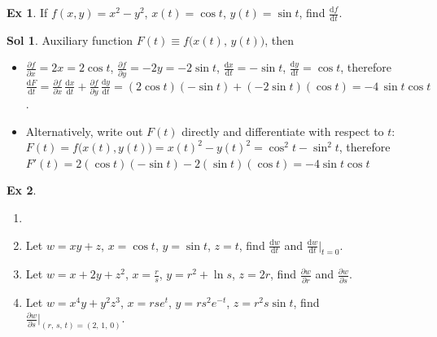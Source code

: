 \documentclass[12pt]{extarticle}
\newcommand{\ds}{\displaystyle}
\theoremstyle{definition}
\newtheorem*{ex}{Ex}
\newtheorem*{sol}{Sol}
\newcommand{\pdiff}[2]{\frac{\partial #1}{\partial #2}}
\newcommand{\diff}[2]{\frac{\mathrm{d} #1}{\mathrm{d} #2}}
\begin{document}
\begin{ex}
  If $\ds f(x,y) = x^2 - y^2$, $x(t) = \cos t$, $y(t) = \sin t$, find $\ds\diff{f}{t}$. 
\end{ex}
\begin{sol}
  Auxiliary function $\ds F(t)\equiv f\big(x(t),\,y(t)\big)$, then
  \begin{itemize}\setlength{\itemsep}{0pt}
    \item $\ds\pdiff{f}{x} = 2x = 2\cos t$, $\ds\pdiff{f}{y} = -2y = -2\sin t$, $\ds\diff{x}{t} = -\sin t$, $\ds\diff{y}{t} = \cos t$, therefore $\ds\diff{F}{t} = \pdiff{f}{x}\,\diff{x}{t} + \pdiff{f}{y}\,\diff{y}{t} = (2\cos t)(-\sin t) + (-2\sin t)(\cos t) = -4\,\sin t\cos t$. 
    \item Alternatively, write out $F(t)$ directly and differentiate with respect to $t$: $\ds F(t) = f\big(x(t),y(t)\big) = x(t)^2 - y(t)^2 = \cos^2t - \sin^2t$, therefore $\ds F'(t) = 2(\cos t)(-\sin t)-2(\sin t)(\cos t) = -4 \sin t\cos t$
  \end{itemize}
\end{sol}

\begin{ex}
  \begin{enumerate}\setlength{\itemsep}{0pt}
    \item[]
    \item Let $\ds w = xy + z$, $\ds x = \cos t$, $\ds y = \sin t$, $\ds z = t$, find $\ds\diff{w}{t}$ and $\ds\diff{w}{t}\Big|_{t = 0}$. 
    \item Let $\ds w = x + 2y + z^2$, $\ds x = \frac{r}{s}$, $\ds y = r^2 + \ln s$, $\ds z = 2r$, find $\ds\pdiff{w}{r}$ and $\ds\pdiff{w}{s}$. 
    \item Let $\ds w = x^4y + y^2z^3$, $\ds x = rse^{t}$, $\ds y = rs^2e^{-t}$, $\ds z = r^2s\sin t$, find $\ds\pdiff{w}{s}\Big|_{(r,\,s,\,t) = (2,\,1,\,0)}$. 
  \end{enumerate}
\end{ex}
\end{document}
